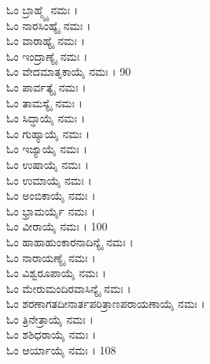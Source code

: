 \begin{multicols}{2}
ಓಂ ಬ್ರಾಹ್ಮ್ಯೈ ನಮಃ ।\\
ಓಂ ನಾರಸಿಂಹ್ಯೈ ನಮಃ ।\\
ಓಂ ವಾರಾಹ್ಯೈ ನಮಃ ।\\
ಓಂ ಇಂದ್ರಾಣ್ಯೈ ನಮಃ ।\\
ಓಂ ವೇದಮಾತೃಕಾಯೈ ನಮಃ । 90\\
ಓಂ ಪಾರ್ವತ್ಯೈ ನಮಃ ।\\
ಓಂ ತಾಮಸ್ಯೈ ನಮಃ ।\\
ಓಂ ಸಿದ್ಧಾಯೈ ನಮಃ ।\\
ಓಂ ಗುಹ್ಯಾಯೈ ನಮಃ ।\\
ಓಂ ಇಜ್ಯಾಯೈ ನಮಃ ।\\
ಓಂ ಉಷಾಯೈ ನಮಃ ।\\
ಓಂ ಉಮಾಯೈ ನಮಃ ।\\
ಓಂ ಅಂಬಿಕಾಯೈ ನಮಃ ।\\
ಓಂ ಭ್ರಾಮರ್ಯೈ ನಮಃ ।\\
ಓಂ ವೀರಾಯೈ ನಮಃ । 100\\
ಓಂ ಹಾಹಾಹುಂಕಾರನಾದಿನ್ಯೈ ನಮಃ ।\\
ಓಂ ನಾರಾಯಣ್ಯೈ ನಮಃ ।\\
ಓಂ ವಿಶ್ವರೂಪಾಯೈ ನಮಃ ।\\
ಓಂ ಮೇರುಮಂದಿರವಾಸಿನ್ಯೈ ನಮಃ ।\\
ಓಂ ಶರಣಾಗತದೀನಾರ್ತಪರಿತ್ರಾಣಪರಾಯಣಾಯೈ ನಮಃ ।\\
ಓಂ ತ್ರಿನೇತ್ರಾಯೈ ನಮಃ ।\\
ಓಂ ಶಶಿಧರಾಯೈ ನಮಃ ।\\
ಓಂ ಆರ್ಯಾಯೈ ನಮಃ । 108
\end{multicols}

